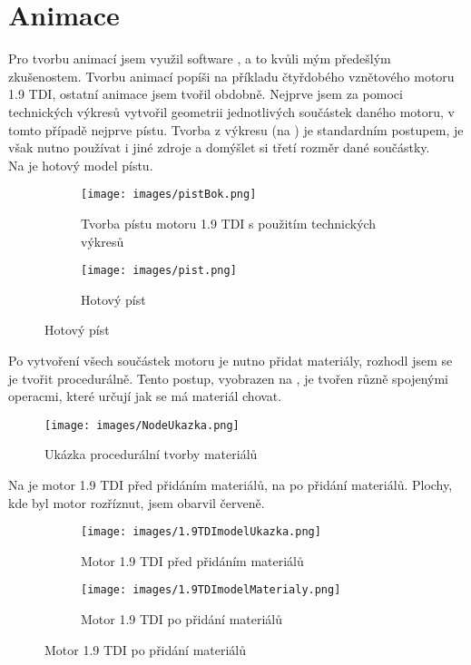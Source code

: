 \section{Animace}\label{sc:animace}
{Pro tvorbu animací jsem využil software , a to kvůli mým předešlým zkušenostem. Tvorbu animací popíši na příkladu čtyřdobého vznětového motoru 1.9 TDI, ostatní animace jsem tvořil obdobně.}\odst
{Nejprve jsem za pomoci technických výkresů vytvořil geometrii jednotlivých součástek daného motoru, v tomto případě nejprve pístu. Tvorba z výkresu (na ) je standardním postupem, je však nutno používat i jiné zdroje a domýšlet si třetí rozměr dané součástky.\\ Na  je hotový model pístu.}

\begin{figure}[H]
    \centering
    \begin{subfigure}{.5\textwidth}
        \centering
        \texttt{[image: images/pistBok.png]}
        \caption{Tvorba pístu motoru 1.9 TDI s použitím technických výkresů \jaObr}
        \label{obr:pistVykresy}
    \end{subfigure}%
    \begin{subfigure}{.5\textwidth}
        \centering
        \texttt{[image: images/pist.png]}
        \caption{Hotový píst \jaObr}
        \label{obr:pistHotovy}
    \end{subfigure}
\end{figure}

{Po vytvoření všech součástek motoru je nutno přidat materiály, rozhodl jsem se je tvořit procedurálně. Tento postup, vyobrazen na , je tvořen různě spojenými operacmi, které určují jak se má materiál chovat.}

\begin{figure}[H]
    \centering
    \texttt{[image: images/NodeUkazka.png]}
    \caption{Ukázka procedurální tvorby materiálů \jaObr}
    \label{obr:NodeUkazka}
\end{figure}

\newpage

{Na  je motor 1.9 TDI před přidáním materiálů, na  po přidání materiálů. Plochy, kde byl motor rozříznut, jsem obarvil červeně.}

\begin{figure}[H]
    \centering
    \begin{subfigure}[t]{.45\textwidth}
        \centering
        \texttt{[image: images/1.9TDImodelUkazka.png]}
        \caption{Motor 1.9 TDI před přidáním materiálů \jaObr}
        \label{obr:predMaterialy}
    \end{subfigure}
    \hfill
    \begin{subfigure}[t]{.45\textwidth}
        \centering
        \texttt{[image: images/1.9TDImodelMaterialy.png]}
        \caption{Motor 1.9 TDI po přidání materiálů \jaObr}
        \label{obr:poMaterialy}
    \end{subfigure}
\end{figure}

